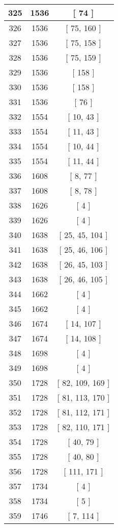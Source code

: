 \begin{center}
\begin{longtable}[H]{|| c c c ||}
325 & 1536 & [ 74 ] \\ 
\hline
326 & 1536 & [ 75, 160 ] \\ 
\hline
327 & 1536 & [ 75, 158 ] \\ 
\hline
328 & 1536 & [ 75, 159 ] \\ 
\hline
329 & 1536 & [ 158 ] \\ 
\hline
330 & 1536 & [ 158 ] \\ 
\hline
331 & 1536 & [ 76 ] \\ 
\hline
332 & 1554 & [ 10, 43 ] \\ 
\hline
333 & 1554 & [ 11, 43 ] \\ 
\hline
334 & 1554 & [ 10, 44 ] \\ 
\hline
335 & 1554 & [ 11, 44 ] \\ 
\hline
336 & 1608 & [ 8, 77 ] \\ 
\hline
337 & 1608 & [ 8, 78 ] \\ 
\hline
338 & 1626 & [ 4 ] \\ 
\hline
339 & 1626 & [ 4 ] \\ 
\hline
340 & 1638 & [ 25, 45, 104 ] \\ 
\hline
341 & 1638 & [ 25, 46, 106 ] \\ 
\hline
342 & 1638 & [ 26, 45, 103 ] \\ 
\hline
343 & 1638 & [ 26, 46, 105 ] \\ 
\hline
344 & 1662 & [ 4 ] \\ 
\hline
345 & 1662 & [ 4 ] \\ 
\hline
346 & 1674 & [ 14, 107 ] \\ 
\hline
347 & 1674 & [ 14, 108 ] \\ 
\hline
348 & 1698 & [ 4 ] \\ 
\hline
349 & 1698 & [ 4 ] \\ 
\hline
350 & 1728 & [ 82, 109, 169 ] \\ 
\hline
351 & 1728 & [ 81, 113, 170 ] \\ 
\hline
352 & 1728 & [ 81, 112, 171 ] \\ 
\hline
353 & 1728 & [ 82, 110, 171 ] \\ 
\hline
354 & 1728 & [ 40, 79 ] \\ 
\hline
355 & 1728 & [ 40, 80 ] \\ 
\hline
356 & 1728 & [ 111, 171 ] \\ 
\hline
357 & 1734 & [ 4 ] \\ 
\hline
358 & 1734 & [ 5 ] \\ 
\hline
359 & 1746 & [ 7, 114 ] \\ 

\end{longtable}
\end{center}

